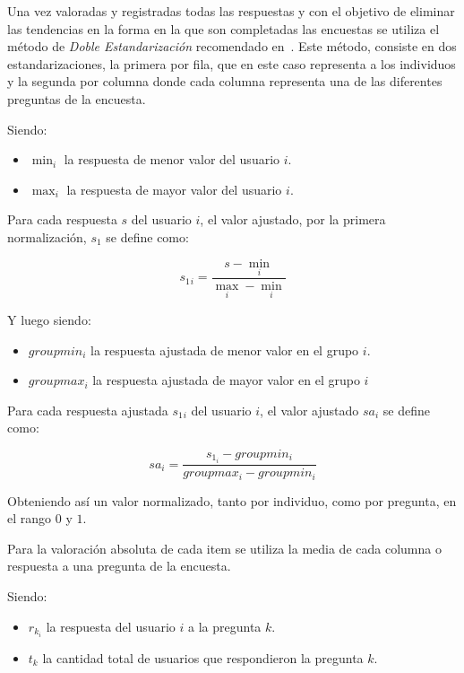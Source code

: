 Una vez valoradas y registradas todas las respuestas y con el objetivo de
eliminar las tendencias en la forma en la que son completadas las
encuestas\cite{Fischer2010} se utiliza el método de \emph{Doble Estandarización}
recomendado en~\cite{Pagolu2011}. Este método, consiste en dos
estandarizaciones, la primera por fila, que en este caso representa a los
individuos y la segunda por columna donde cada columna representa una de las
diferentes preguntas de la encuesta.

Siendo:
\begin{itemize}
	\item $\min_i$ la respuesta de menor valor del usuario $i$.
	\item $\max_i$ la respuesta de mayor valor del usuario $i$.
\end{itemize}

Para cada respuesta $s$ del usuario $i$, el valor ajustado, por la primera 
normalización, $s_1$ se define como:

\begin{equation}
s_1{_i}=\frac{s-\min_i}{\max_i-\min_i}
\end{equation}

Y luego siendo:
\begin{itemize}
	\item $groupmin_i$ la respuesta ajustada de menor valor en el grupo $i$.
	\item $groupmax_i$ la respuesta ajustada de mayor valor en el grupo $i$
\end{itemize}

Para cada respuesta ajustada $s_1{_i}$ del usuario $i$, el valor ajustado $sa_i$ se
define como:	

\begin{equation}
sa_i=\frac{s_{1_i}-groupmin_i}{groupmax_i-groupmin_i}
\end{equation}

Obteniendo así un valor normalizado, tanto por individuo, como por pregunta, en
el rango $0$ y $1$.

Para la valoración absoluta de cada  item se utiliza la media de cada columna o
respuesta a una pregunta de la encuesta.

Siendo:
\begin{itemize} 
\item $r_{k_i}$ la respuesta del usuario $i$ a la pregunta $k$.
\item $t_k$ la cantidad total de usuarios que respondieron la pregunta $k$.
\end{itemize}

